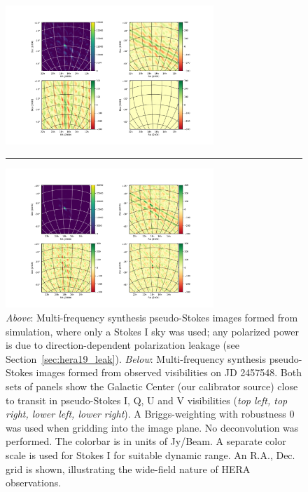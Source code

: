 \begin{figure}
\centering
\includegraphics[width=0.7\textwidth]{chapters/eor_window_HERA/figures/sim4pol.pdf}
\par\noindent\rule{0.8\textwidth}{0.4pt}
\includegraphics[width=0.7\textwidth]{chapters/eor_window_HERA/figures/new4pol.pdf}
\caption[Multi-frequency synthesis pseudo-Stokes images formed from simulation and data.]{
\textit{Above}: Multi-frequency synthesis pseudo-Stokes images formed from simulation, where only a Stokes I sky was used; any polarized power is due to direction-dependent polarization leakage (see Section~\ref{sec:hera19_leak}).
\textit{Below}: Multi-frequency synthesis pseudo-Stokes images formed from observed visibilities on JD 2457548.
Both sets of panels show the Galactic Center (our calibrator source) close to transit in pseudo-Stokes I, Q, U and V visibilities (\textit{top left, top right, lower left, lower right}). A Briggs-weighting with robustness 0 was used when gridding into the image plane. No deconvolution was performed. The colorbar is in units of Jy/Beam.
A separate color scale is used for Stokes I for suitable dynamic range. An R.A., Dec. grid is shown, illustrating the wide-field nature of HERA observations.
}
\label{fig:hera19_GCimage}
\end{figure}


